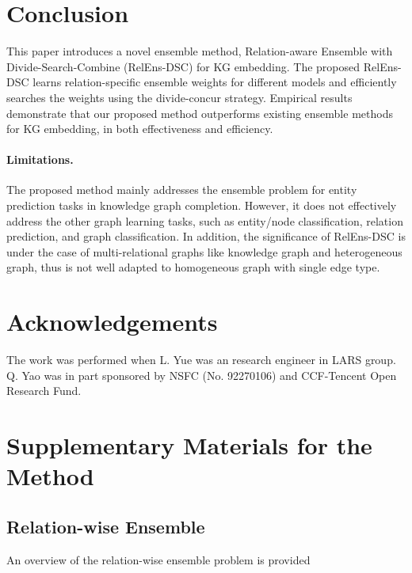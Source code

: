 \documentclass[11pt,a4paper]{article}
\begin{document}
  
  
  \section{Conclusion}
  
  This paper introduces a novel ensemble method, Relation-aware Ensemble 
  with Divide-Search-Combine (RelEns-DSC) for KG embedding.
  The proposed RelEns-DSC learns relation-specific ensemble weights for different models
  and efficiently searches the weights using the divide-concur strategy.
  Empirical results demonstrate that our proposed method 
  outperforms existing ensemble methods for
  KG embedding,
  in both effectiveness and efficiency.
  


\paragraph{Limitations.}
  The proposed method mainly addresses the ensemble problem for entity prediction tasks in knowledge graph completion. 
  However, it does not effectively address 
  the other graph learning tasks,
  such as entity/node classification,
  relation prediction, 
  and graph classification.
  In addition,
  the significance of RelEns-DSC is under the case of
  multi-relational graphs like knowledge graph and heterogeneous graph,
  thus is not well adapted to homogeneous graph with single edge type.
  
 \section*{Acknowledgements}
 
 The work was performed when L. Yue was an research engineer in LARS group.
 Q. Yao was in part sponsored by NSFC (No. 92270106) and CCF-Tencent Open Research Fund.
  
 \clearpage
  


  
  \clearpage
  \appendix
  
  
  \onecolumn
  
  \section{Supplementary Materials for the Method}
  
  \subsection{Relation-wise Ensemble}
  An overview of the relation-wise ensemble problem is provided
  
\end{document}
